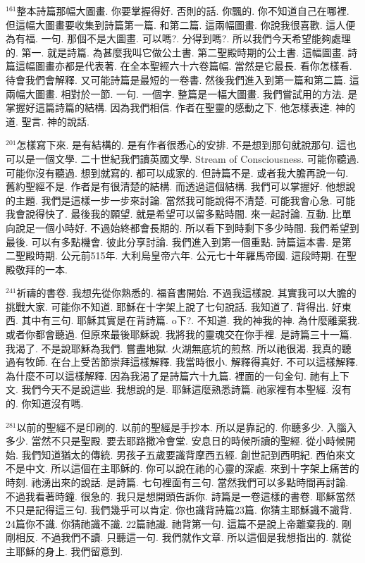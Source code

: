 \documentclass{book}
\begin{document}
$^{161}$整本詩篇那幅大圖畫.
你要掌握得好.
否則的話.
你飄的.
你不知道自己在哪裡.
但這幅大圖畫要收集到詩篇第一篇.
和第二篇.
這兩幅圖畫.
你說我很喜歡.
這人便為有福.
一句.
那個不是大圖畫.
可以嗎?.
分得到嗎?.
所以我們今天希望能夠處理的.
第一.
就是詩篇.
為甚麼我叫它做公土書.
第二聖殿時期的公土書.
這幅圖畫.
詩篇這幅圖畫亦都是代表著.
在全本聖經六十六卷篇幅.
當然是它最長.
看你怎樣看.
待會我們會解釋.
又可能詩篇是最短的一卷書.
然後我們進入到第一篇和第二篇.
這兩幅大圖畫.
相對於一節.
一句.
一個字.
整篇是一幅大圖畫.
我們嘗試用的方法.
是掌握好這篇詩篇的結構.
因為我們相信.
作者在聖靈的感動之下.
他怎樣表達.
神的道.
聖言.
神的說話.

$^{201}$怎樣寫下來.
是有結構的.
是有作者很悉心的安排.
不是想到那句就說那句.
這也可以是一個文學.
二十世紀我們讀英國文學.
Stream of Consciousness.
可能你聽過.
可能你沒有聽過.
想到就寫的.
都可以成家的.
但詩篇不是.
或者我大膽再說一句.
舊約聖經不是.
作者是有很清楚的結構.
而透過這個結構.
我們可以掌握好.
他想說的主題.
我們是這樣一步一步來討論.
當然我可能說得不清楚.
可能我會心急.
可能我會說得快了.
最後我的願望.
就是希望可以留多點時間.
來一起討論.
互動.
比單向說足一個小時好.
不過始終都會長期的.
所以看下到時剩下多少時間.
我們希望到最後.
可以有多點機會.
彼此分享討論.
我們進入到第一個重點.
詩篇這本書.
是第二聖殿時期.
公元前515年.
大利烏皇帝六年.
公元七十年羅馬帝國.
這段時期.
在聖殿敬拜的一本.

$^{241}$祈禱的書卷.
我想先從你熟悉的.
福音書開始.
不過我這樣說.
其實我可以大膽的挑戰大家.
可能你不知道.
耶穌在十字架上說了七句說話.
我知道了.
背得出.
好東西.
其中有三句.
耶穌其實是在背詩篇.
o下?.
不知道.
我的神我的神.
為什麼離棄我.
或者你都會聽過.
但原來最後耶穌說.
我將我的靈魂交在你手裡.
是詩篇三十一篇.
我渴了.
不是說耶穌為我們.
嘗盡地獄.
火湖無底坑的煎熬.
所以祂很渴.
我真的聽過有牧師.
在台上受苦節崇拜這樣解釋.
我當時很小.
解釋得真好.
不可以這樣解釋.
為什麼不可以這樣解釋.
因為我渴了是詩篇六十九篇.
裡面的一句金句.
祂有上下文.
我們今天不是說這些.
我想說的是.
耶穌這麼熟悉詩篇.
祂家裡有本聖經.
沒有的.
你知道沒有嗎.

$^{281}$以前的聖經不是印刷的.
以前的聖經是手抄本.
所以是靠記的.
你聽多少.
入腦入多少.
當然不只是聖殿.
要去耶路撒冷會堂.
安息日的時候所讀的聖經.
從小時候開始.
我們知道猶太的傳統.
男孩子五歲要識背摩西五經.
創世記到西明紀.
西伯來文不是中文.
所以這個在主耶穌的.
你可以說在祂的心靈的深處.
來到十字架上痛苦的時刻.
祂湧出來的說話.
是詩篇.
七句裡面有三句.
當然我們可以多點時間再討論.
不過我看著時鐘.
很急的.
我只是想開頭告訴你.
詩篇是一卷這樣的書卷.
耶穌當然不只是記得這三句.
我們幾乎可以肯定.
你也識背詩篇23篇.
你猜主耶穌識不識背.
24篇你不識.
你猜祂識不識.
22篇祂識.
祂背第一句.
這篇不是說上帝離棄我的.
剛剛相反.
不過我們不讀.
只聽這一句.
我們就作文章.
所以這個是我想指出的.
就從主耶穌的身上.
我們留意到.
\end{document}
